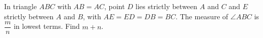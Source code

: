 In triangle $ABC$ with $AB=AC$, point $D$ lies strictly between $A$ and $C$ and $E$ strictly between $A$ and $B$, with $AE=ED=DB=BC$. The measure of $\angle ABC$ is $\dfrac mn$ in lowest terms. Find $m+n$.

